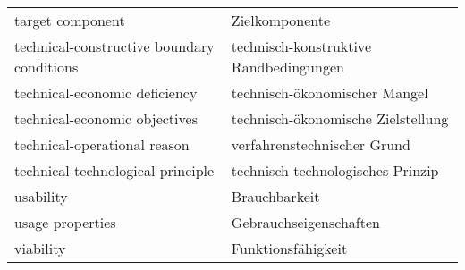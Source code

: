 \documentclass[11pt,a4paper]{article}
\begin{document}
\begin{center}
\begin{tabular}{l|l}
    target component & Zielkomponente\\
    technical-constructive boundary conditions & technisch-konstruktive
    Randbedingungen \\
    technical-economic deficiency & technisch-ökonomischer Mangel\\
    technical-economic objectives & technisch-ökonomische Zielstellung\\
    technical-operational reason & verfahrenstechnischer Grund \\
    technical-technological principle & technisch-technologisches Prinzip\\
    usability & Brauchbarkeit \\
    usage properties & Gebrauchseigenschaften \\
    viability & Funktionsfähigkeit \\
  \end{tabular}
\end{center}
\end{document}
